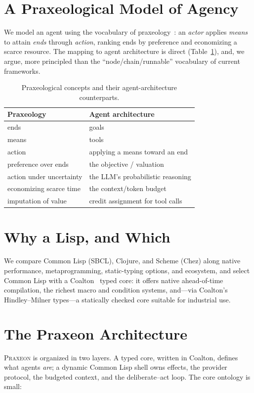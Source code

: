 \documentclass[11pt,a4paper]{article}
\begin{document}
\section{A Praxeological Model of Agency}
\label{sec:praxeology}
We model an agent using the vocabulary of praxeology~\citep{mises1949human}: an
\emph{actor} applies \emph{means} to attain \emph{ends} through \emph{action},
ranking ends by preference and economizing a scarce resource. The mapping to
agent architecture is direct (Table~\ref{tab:map}), and, we argue, more
principled than the ``node/chain/runnable'' vocabulary of current frameworks.

\begin{table}[h]
\centering
\caption{Praxeological concepts and their agent-architecture counterparts.}
\label{tab:map}
\begin{tabular}{ll}
\toprule
Praxeology & Agent architecture \\
\midrule
ends & goals \\
means & tools \\
action & applying a means toward an end \\
preference over ends & the objective / valuation \\
action under uncertainty & the LLM's probabilistic reasoning \\
economizing scarce time & the context/token budget \\
imputation of value & credit assignment for tool calls \\
\bottomrule
\end{tabular}
\end{table}

\section{Why a Lisp, and Which}
\label{sec:whichlisp}
We compare Common Lisp (SBCL), Clojure, and Scheme (Chez) along native
performance, metaprogramming, static-typing options, and ecosystem, and select
Common Lisp with a Coalton~\citep{coalton} typed core: it offers native
ahead-of-time compilation, the richest macro and condition systems, and---via
Coalton's Hindley--Milner types---a statically checked core suitable for
industrial use.

\section{The Praxeon Architecture}
\label{sec:arch}
\textsc{Praxeon} is organized in two layers. A typed core, written in Coalton,
defines what agents \emph{are}; a dynamic Common Lisp shell owns effects, the
provider protocol, the budgeted context, and the deliberate--act loop. The core
ontology is small:
\end{document}
